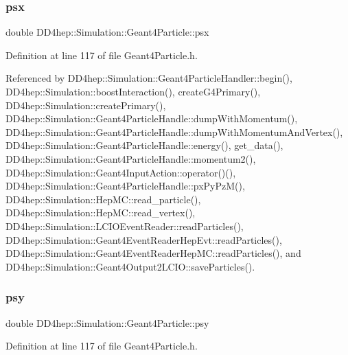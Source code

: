 \subsubsection{\texorpdfstring{psx}{psx}}
{\footnotesize\ttfamily double D\+D4hep\+::\+Simulation\+::\+Geant4\+Particle\+::psx}



Definition at line 117 of file Geant4\+Particle.\+h.



Referenced by D\+D4hep\+::\+Simulation\+::\+Geant4\+Particle\+Handler\+::begin(), D\+D4hep\+::\+Simulation\+::boost\+Interaction(), create\+G4\+Primary(), D\+D4hep\+::\+Simulation\+::create\+Primary(), D\+D4hep\+::\+Simulation\+::\+Geant4\+Particle\+Handle\+::dump\+With\+Momentum(), D\+D4hep\+::\+Simulation\+::\+Geant4\+Particle\+Handle\+::dump\+With\+Momentum\+And\+Vertex(), D\+D4hep\+::\+Simulation\+::\+Geant4\+Particle\+Handle\+::energy(), get\+\_\+data(), D\+D4hep\+::\+Simulation\+::\+Geant4\+Particle\+Handle\+::momentum2(), D\+D4hep\+::\+Simulation\+::\+Geant4\+Input\+Action\+::operator()(), D\+D4hep\+::\+Simulation\+::\+Geant4\+Particle\+Handle\+::px\+Py\+Pz\+M(), D\+D4hep\+::\+Simulation\+::\+Hep\+M\+C\+::read\+\_\+particle(), D\+D4hep\+::\+Simulation\+::\+Hep\+M\+C\+::read\+\_\+vertex(), D\+D4hep\+::\+Simulation\+::\+L\+C\+I\+O\+Event\+Reader\+::read\+Particles(), D\+D4hep\+::\+Simulation\+::\+Geant4\+Event\+Reader\+Hep\+Evt\+::read\+Particles(), D\+D4hep\+::\+Simulation\+::\+Geant4\+Event\+Reader\+Hep\+M\+C\+::read\+Particles(), and D\+D4hep\+::\+Simulation\+::\+Geant4\+Output2\+L\+C\+I\+O\+::save\+Particles().

\hypertarget{class_d_d4hep_1_1_simulation_1_1_geant4_particle_abc3b6008b4d4366bce059fa360e8d3c7}{}\label{class_d_d4hep_1_1_simulation_1_1_geant4_particle_abc3b6008b4d4366bce059fa360e8d3c7} 
\subsubsection{\texorpdfstring{psy}{psy}}
{\footnotesize\ttfamily double D\+D4hep\+::\+Simulation\+::\+Geant4\+Particle\+::psy}



Definition at line 117 of file Geant4\+Particle.\+h.



